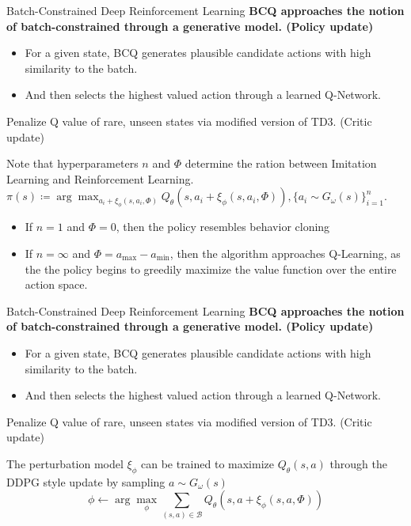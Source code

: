 \documentclass[11pt]{beamer}
\newcommand{\mc}[1]{\mathcal{#1}}
\newcommand{\tb}[1]{\textbf{#1}}
\begin{document}
\begin{frame}{Batch-Constrained Deep Reinforcement Learning}
    \tb{BCQ approaches the notion of batch-constrained through a generative model. (Policy update)}
    \begin{itemize}
        \item For a given state, BCQ generates plausible candidate actions with high similarity to the batch.
        \item And then selects the highest valued action through a learned Q-Network.
    \end{itemize}

    Penalize Q value of rare, unseen states via modified version of TD3. (Critic update)
    \bigskip

    \vfill

    Note that hyperparameters $n$ and $\Phi$ determine the ration between Imitation Learning and Reinforcement Learning.
    $\pi(s) \coloneqq \arg \max_{a_i + \xi_\phi(s,a_i, \Phi)} Q_\theta (s,a_i + \xi_\phi (s,a_i, \Phi)), \{a_i \sim G_\omega(s)\}_{i=1}^n$.
    \begin{itemize}
        \item If $n=1$ and $\Phi=0$, then the policy resembles behavior cloning
        \item If $n=\infty$ and $\Phi = a_{\text{max}} - a_{\text{min}}$, then the algorithm approaches Q-Learning, as the the policy begins to greedily maximize the value function over the entire action space.
    \end{itemize}
\end{frame}


\begin{frame}{Batch-Constrained Deep Reinforcement Learning}
    \tb{BCQ approaches the notion of batch-constrained through a generative model. (Policy update)}
    \begin{itemize}
        \item For a given state, BCQ generates plausible candidate actions with high similarity to the batch.
        \item And then selects the highest valued action through a learned Q-Network.
    \end{itemize}

    Penalize Q value of rare, unseen states via modified version of TD3. (Critic update)
    \bigskip

    \vfill

    The perturbation model $\xi_\phi$ can be trained to maximize $Q_\theta(s,a)$ through the DDPG style update by sampling $a \sim G_\omega (s)$
    \[
        \phi \leftarrow \arg\max_\phi \sum_{(s,a) \in \mc{B}} Q_\theta (s, a+ \xi_\phi (s,a, \Phi))
    \]
\end{frame}
\end{document}
